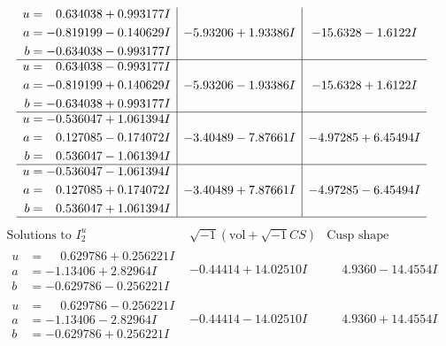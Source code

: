\documentclass[1p]{elsarticle_modified}
\theoremstyle{definition}
\newcommand{\I}{\sqrt{-1}}
\begin{document}
$$\begin{array}{c|c|c}
\begin{aligned}
u &= \phantom{-}0.634038 + 0.993177 I \\
a &= -0.819199 - 0.140629 I \\
b &= -0.634038 - 0.993177 I\end{aligned}
 & -5.93206 + 1.93386 I & -15.6328 - 1.6122 I \\ \hline\begin{aligned}
u &= \phantom{-}0.634038 - 0.993177 I \\
a &= -0.819199 + 0.140629 I \\
b &= -0.634038 + 0.993177 I\end{aligned}
 & -5.93206 - 1.93386 I & -15.6328 + 1.6122 I \\ \hline\begin{aligned}
u &= -0.536047 + 1.061394 I \\
a &= \phantom{-}0.127085 - 0.174072 I \\
b &= \phantom{-}0.536047 - 1.061394 I\end{aligned}
 & -3.40489 - 7.87661 I & -4.97285 + 6.45494 I \\ \hline\begin{aligned}
u &= -0.536047 - 1.061394 I \\
a &= \phantom{-}0.127085 + 0.174072 I \\
b &= \phantom{-}0.536047 + 1.061394 I\end{aligned}
 & -3.40489 + 7.87661 I & -4.97285 - 6.45494 I\\
 \hline 
 \end{array}$$\newpage$$\begin{array}{c|c|c}  
\text{Solutions to }I^u_{2}& \I (\text{vol} + \sqrt{-1}CS) & \text{Cusp shape}\\
 \hline 
\begin{aligned}
u &= \phantom{-}0.629786 + 0.256221 I \\
a &= -1.13406 + 2.82964 I \\
b &= -0.629786 - 0.256221 I\end{aligned}
 & -0.44414 + 14.02510 I & \phantom{-}4.9360 - 14.4554 I \\ \hline\begin{aligned}
u &= \phantom{-}0.629786 - 0.256221 I \\
a &= -1.13406 - 2.82964 I \\
b &= -0.629786 + 0.256221 I\end{aligned}
 & -0.44414 - 14.02510 I & \phantom{-}4.9360 + 14.4554 I \\ \hline\begin{aligned}

\end{aligned}
\end{array}$$
\end{document}
